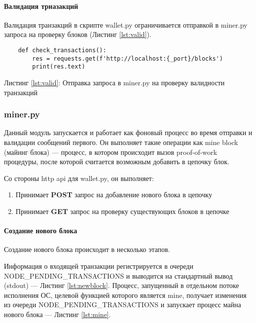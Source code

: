 \paragraph{Валидация трназакций}
Валидация транзакций в скрипте {\small wallet.py} ограничивается отправкой в
{\small miner.py} запроса на проверку блоков (Листинг \ref{lst:valid}).

\begin{center}
\begin{lstlisting}
    def check_transactions():
        res = requests.get(f'http://localhost:{_port}/blocks')
        print(res.text)
\end{lstlisting}\label{lst:valid}
    Листинг \ref{lst:valid}: Отправка запроса в {\small miner.py} на проверку
    валидности транзакций
\end{center}


\subsubsection{miner.py}
Данный модуль запускается и работает как фоновый процесс во время отправки и
валидации сообщений первого. Он выполняет такие операции как mine block (майннг
блока) --- процесс, в котором происходит вызов proof-of-work процедуры, после
которой считается возможным добавить в цепочку блок.

Со стороны http api для {\small wallet.py}, он выполняет:
\begin{enumerate}
    \item Принимает \textbf{POST} запрос на добавление нового блока в цепочку
    \item Принимает \textbf{GET} запрос на проверку существующих блоков в
          цепочке
\end{enumerate}

\paragraph{Создание нового блока}
Создание нового блока происходит в несколько этапов.

Информация о входящей транзакции регистрируется в очереди {\small
NODE\_PENDING\_TRANSACTIONS} и выводится на стандартный вывод (stdout) ---
Листинг \ref{lst:newblock}.  Процесс, запущенный в отдельном потоке исполнения
ОС, целевой функцией которого является mine, получает изменения из очереди
{\small NODE\_PENDING\_TRANSACTIONS} и запускает процесс майна нового блока ---
Листинг \ref{lst:mine}.

